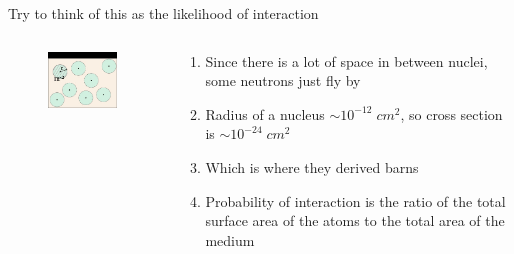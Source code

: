 \documentclass[aspectratio=1610,pdftex,dvipsnames,compress,xcolor={dvipsnames}]{beamer}
\begin{document}
\begin{frame}{Try to think of this as the likelihood of interaction}
    \begin{columns}[t]

        \begin{column}{0.40\textwidth}
            \begin{figure}
                \centering
                \includegraphics[width=0.95\textwidth]{cross.section.jpg}
            \end{figure}
        \end{column}

        \begin{column}{0.60\textwidth}
            \begin{enumerate}[series=outerlist,topsep=0pt,itemsep=21pt,leftmargin=*,label=(\arabic*)]
                \item[]Since there is a lot of space in between nuclei, some neutrons just fly by
                \item[]Radius of a nucleus $\sim 10^{-12} \; cm^2$, so cross section is $\sim 10^{-24} \; cm^2$  
                \item[]Which is where they derived barns
                \item[]Probability of interaction is the ratio of the total surface area of the atoms to the total area of the medium
            \end{enumerate}
        \end{column}

    \end{columns}
\end{frame}
\end{document}
